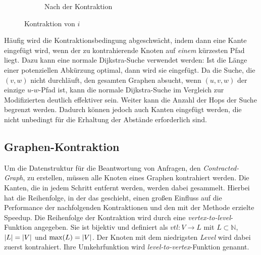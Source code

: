 \begin{figure}[h!]
\begin{subfigure}[b]{0.49\textwidth}
{
    }
    \caption{Nach der Kontraktion}
  \end{subfigure}
  \caption{Kontraktion von $i$}
  \label{graphs:fig:example_contraction}
\end{figure}

Häufig wird die Kontraktionsbedingung abgeschwächt, indem dann eine Kante eingefügt wird, wenn der zu kontrahierende Knoten auf \emph{einem} kürzesten Pfad liegt.
Dazu kann eine normale Dijkstra-Suche verwendet werden: Ist die Länge einer potenziellen Abkürzung optimal, dann wird sie eingefügt.
Da die Suche, die $(v, w)$ nicht durchläuft, den gesamten Graphen absucht, wenn $(u, v, w)$ der einzige $u$-$w$-Pfad ist, kann die normale Dijkstra-Suche im Vergleich zur Modifizierten deutlich effektiver sein.
Weiter kann die Anzahl der Hops der Suche begrenzt werden.
Dadurch können jedoch auch Kanten eingefügt werden, die nicht unbedingt für die Erhaltung der Abstände erforderlich sind.

\subsection{Graphen-Kontraktion}

Um die Datenstruktur für die Beantwortung von Anfragen, den \emph{Contracted-Graph}, zu erstellen, müssen alle Knoten eines Graphen kontrahiert werden. Die Kanten, die in jedem Schritt entfernt werden, werden dabei gesammelt.
Hierbei hat die Reihenfolge, in der das geschieht, einen großen Einfluss auf die Performance der nachfolgenden Kontraktionen und den mit der Methode erzielte Speedup.
Die Reihenfolge der Kontraktion wird durch eine \emph{vertex-to-level}-Funktion angegeben.
Sie ist bijektiv und definiert als ${vtl} \colon V \to L$ mit $L \subset \mathbb{N}$, $\abs{L} = \abs{V}$ und $\max(L) = \abs{V}$.
Der Knoten mit dem niedrigsten \emph{Level} wird dabei zuerst kontrahiert.
Ihre Umkehrfunktion wird \emph{level-to-vertex}-Funktion genannt.

